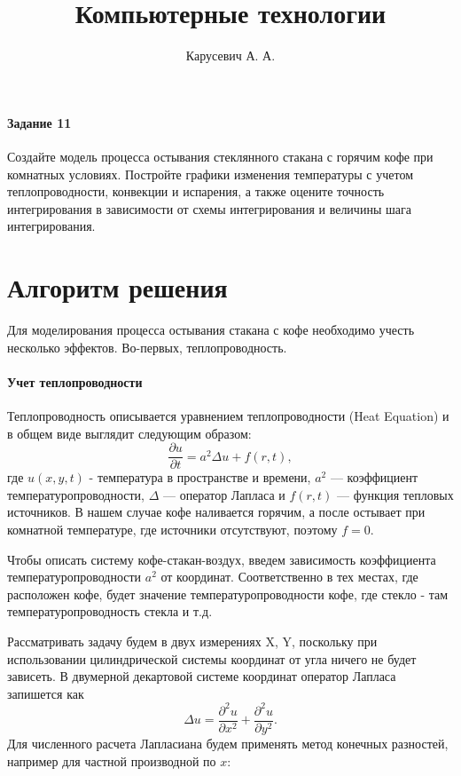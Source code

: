 



\title{Компьютерные технологии}
\author{Карусевич А. А.}
\date{}




\maketitle

\paragraph{Задание 11} Создайте модель процесса остывания стеклянного стакана с горячим кофе при 
комнатных условиях. Постройте графики изменения температуры с учетом теплопроводности, 
конвекции и испарения, а также оцените точность интегрирования в зависимости от схемы 
интегрирования и величины шага интегрирования.


\section{Алгоритм решения}
Для моделирования процесса остывания стакана с кофе необходимо учесть несколько эффектов. Во-первых, теплопроводность. 

\paragraph{Учет теплопроводности} Теплопроводность описывается уравнением
теплопроводности (Heat Equation) и в общем виде выглядит следующим образом:
\begin{equation}
	\frac{\partial u}{\partial t} = a^2 \Delta u + f(r,t),
\end{equation}
где $u(x,y,t)$ - температура в пространстве и времени, $a^2$ —  коэффициент температуропроводности, $\Delta$ — оператор Лапласа и $f(r,t)$ — функция тепловых источников. 
В нашем случае кофе наливается горячим, а после остывает при комнатной
температуре, где источники отсутствуют, поэтому $f = 0$.

Чтобы описать систему кофе-стакан-воздух, введем зависимость коэффициента температуропроводности $a^2$ от координат. Соответственно в тех местах,
где расположен кофе, будет значение температуропроводности кофе, где стекло - там температуропроводность стекла и т.д.


Рассматривать задачу будем в двух измерениях X, Y, поскольку при использовании цилиндрической системы координат от
угла ничего не будет зависеть.
В двумерной декартовой системе координат оператор Лапласа запишется как
\begin{equation}
	\Delta u = \frac{\partial^2 u}{\partial x^2} + \frac{\partial^2 u}{\partial
    y^2}.
\end{equation}
Для численного расчета Лапласиана будем применять метод конечных разностей, например для частной производной по $x$:


